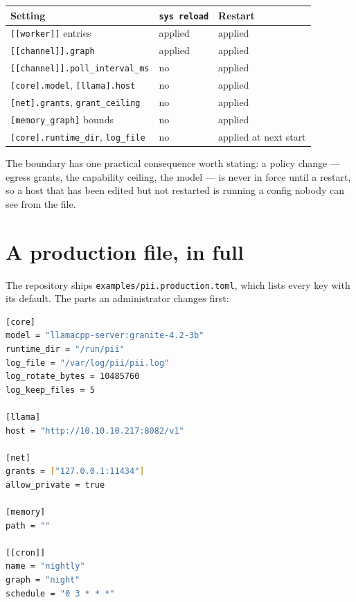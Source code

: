 \begin{center}
\begin{tabular}{@{}>{\raggedright\arraybackslash}p{}>{\raggedright\arraybackslash}p{}>{\raggedright\arraybackslash}p{}@{}}
  \toprule
  \textbf{Setting} & \texttt{sys reload} & \textbf{Restart} \\
  \midrule
  \texttt{[[worker]]} entries & applied & applied \\
  \texttt{[[channel]].graph} & applied & applied \\
  \texttt{[[channel]].poll\_interval\_ms} & no & applied \\
  \texttt{[core].model}, \texttt{[llama].host} & no & applied \\
  \texttt{[net].grants}, \texttt{grant\_ceiling} & no & applied \\
  \texttt{[memory\_graph]} bounds & no & applied \\
  \texttt{[core].runtime\_dir}, \texttt{log\_file} & no & applied at next start \\
  \bottomrule
\end{tabular}
\end{center}

The boundary has one practical consequence worth stating: a policy change --- egress grants,
the capability ceiling, the model --- is never in force until a restart, so a host that has
been edited but not restarted is running a config nobody can see from the file.

\section{A production file, in full}

The repository ships \texttt{examples/pii.production.toml}, which lists every key with its
default. The parts an administrator changes first:

\begin{lstlisting}[language=bash]
[core]
model = "llamacpp-server:granite-4.2-3b"
runtime_dir = "/run/pii"
log_file = "/var/log/pii/pii.log"
log_rotate_bytes = 10485760
log_keep_files = 5

[llama]
host = "http://10.10.10.217:8082/v1"

[net]
grants = ["127.0.0.1:11434"]
allow_private = true

[memory]
path = ""

[[cron]]
name = "nightly"
graph = "night"
schedule = "0 3 * * *"
\end{lstlisting}


